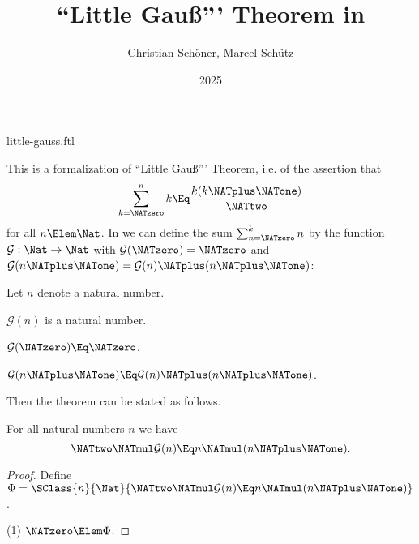 \documentclass{stex}
\title{``Little Gauß''' Theorem in \Naproche}
\author{Christian Schöner, Marcel Schütz}
\date{2025}
\newcommand{\gauss}{\mathcal{G}}
\begin{document}
\begin{smodule}{little-gauss.ftl}
\maketitle


\noindent This is a formalization of ``Little Gauß''' Theorem, i.e. of
the assertion that
\[\sum_{k = \NATzero}^n k \Eq \frac{k(k \NATplus \NATone)}\NATtwo\]
for all $n \Elem \Nat$.
In \Naproche we can define the sum $\sum_{n = \NATzero}^k n$ by the function
$\gauss : \Nat \to \Nat$ with $\gauss(\NATzero) = \NATzero$ and
$\gauss(n \NATplus \NATone) = \gauss(n) \NATplus (n \NATplus \NATone)$:

\begin{forthel}
  Let $n$ denote a natural number.

  \begin{signature*}
    $\gauss(n)$ is a natural number.
  \end{signature*}

  \begin{axiom*}
    $\gauss(\NATzero) \Eq \NATzero$.
  \end{axiom*}

  \begin{axiom*}
    $\gauss(n \NATplus \NATone) \Eq \gauss(n) \NATplus (n \NATplus \NATone)$.
  \end{axiom*}
\end{forthel}

\noindent Then the theorem can be stated as follows.

\begin{forthel}
  \begin{theorem*}[title=Little Gauß,id=little_gauss]
    For all natural numbers $n$ we have
    \[\NATtwo \NATmul \gauss(n) \Eq n \NATmul (n \NATplus \NATone).\]
  \end{theorem*}
  \begin{proof}
    Define $\Phi = \SClass{n}{\Nat}{\NATtwo \NATmul \gauss(n) \Eq n \NATmul (n \NATplus \NATone)}$.
    
    (1) $\NATzero \Elem \Phi$.


\end{proof}
\end{forthel}
\end{smodule}
\end{document}
